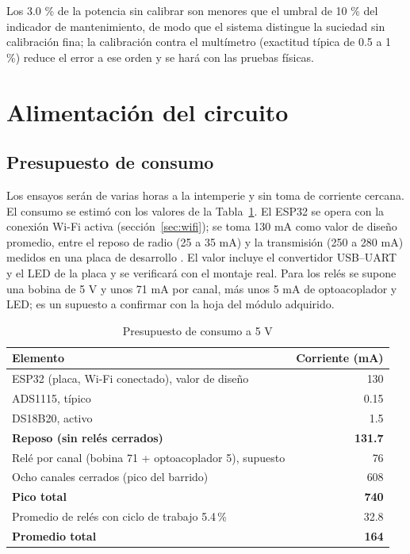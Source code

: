 \documentclass[10pt,letterpaper,twocolumn]{article}
\begin{document}
Los 3.0 \% de la potencia sin calibrar son menores que el umbral de 10 \% del indicador de mantenimiento, de modo que el sistema distingue la suciedad sin calibración fina; la calibración contra el multímetro (exactitud típica de 0.5 a 1 \%) reduce el error a ese orden y se hará con las pruebas físicas.

\section{Alimentación del circuito}\label{sec:alim}
\subsection{Presupuesto de consumo}
Los ensayos serán de varias horas a la intemperie y sin toma de corriente cercana. El consumo se estimó con los valores de la Tabla~\ref{tab:cons}. El ESP32 se opera con la conexión Wi-Fi activa (sección~\ref{sec:wifi}); se toma 130 mA como valor de diseño promedio, entre el reposo de radio (25 a 35 mA) y la transmisión (250 a 280 mA) medidos en una placa de desarrollo \cite{hubble}. El valor incluye el convertidor USB--UART y el LED de la placa y se verificará con el montaje real. Para los relés se supone una bobina de 5 V y unos 71 mA por canal, más unos 5 mA de optoacoplador y LED; es un supuesto a confirmar con la hoja del módulo adquirido.

\begin{table}[t]
\centering
\caption{Presupuesto de consumo a 5 V}
\label{tab:cons}
\footnotesize
\begin{tabularx}{\columnwidth}{@{}Xr@{}}
\toprule
Elemento & Corriente (mA)\\
\midrule
ESP32 (placa, Wi-Fi conectado), valor de diseño & 130\\
ADS1115, típico \cite{ads1115} & 0.15\\
DS18B20, activo \cite{ds18b20} & 1.5\\
\textbf{Reposo (sin relés cerrados)} & \textbf{131.7}\\
Relé por canal (bobina 71 \cite{relmod} + optoacoplador 5), supuesto & 76\\
Ocho canales cerrados (pico del barrido) & 608\\
\textbf{Pico total} & \textbf{740}\\
Promedio de relés con ciclo de trabajo 5.4\,\% & 32.8\\
\textbf{Promedio total} & \textbf{164}\\
\bottomrule
\end{tabularx}
\end{table}
\end{document}
